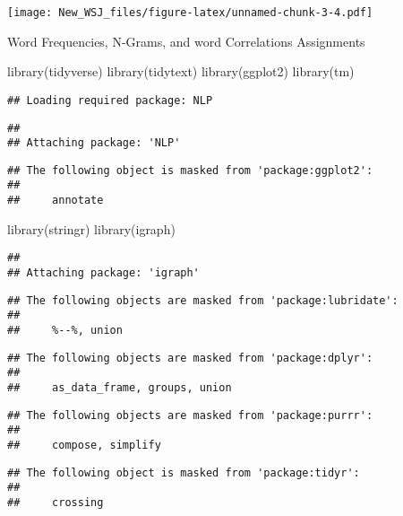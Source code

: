 \documentclass[
]{article}
\newenvironment{Shaded}{\begin{snugshade}}{\end{snugshade}}
\newcommand{\FunctionTok}[1]{\textcolor[rgb]{0.00,0.00,0.00}{#1}}
\newcommand{\NormalTok}[1]{#1}
\begin{document}
\texttt{[image: New\_WSJ\_files/figure-latex/unnamed-chunk-3-4.pdf]}

Word Frequencies, N-Grams, and word Correlations Assignments

\begin{Shaded}
\begin{Highlighting}[]
\FunctionTok{library}\NormalTok{(tidyverse)}
\FunctionTok{library}\NormalTok{(tidytext)}
\FunctionTok{library}\NormalTok{(ggplot2)}
\FunctionTok{library}\NormalTok{(tm)}
\end{Highlighting}
\end{Shaded}

\begin{verbatim}
## Loading required package: NLP
\end{verbatim}

\begin{verbatim}
## 
## Attaching package: 'NLP'
\end{verbatim}

\begin{verbatim}
## The following object is masked from 'package:ggplot2':
## 
##     annotate
\end{verbatim}

\begin{Shaded}
\begin{Highlighting}[]
\FunctionTok{library}\NormalTok{(stringr)}
\FunctionTok{library}\NormalTok{(igraph)}
\end{Highlighting}
\end{Shaded}

\begin{verbatim}
## 
## Attaching package: 'igraph'
\end{verbatim}

\begin{verbatim}
## The following objects are masked from 'package:lubridate':
## 
##     %--%, union
\end{verbatim}

\begin{verbatim}
## The following objects are masked from 'package:dplyr':
## 
##     as_data_frame, groups, union
\end{verbatim}

\begin{verbatim}
## The following objects are masked from 'package:purrr':
## 
##     compose, simplify
\end{verbatim}

\begin{verbatim}
## The following object is masked from 'package:tidyr':
## 
##     crossing
\end{verbatim}
\end{document}
